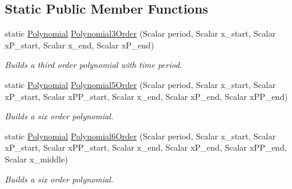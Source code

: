\subsection*{Static Public Member Functions}
\begin{DoxyCompactItemize}
\item 
static \hyperlink{classow__core_1_1Polynomial}{Polynomial} \hyperlink{classow__core_1_1Polynomial_a3a636b73b9a0370451c061065dba2aca}{Polynomial3\+Order} (Scalar period, Scalar x\+\_\+start, Scalar x\+P\+\_\+start, Scalar x\+\_\+end, Scalar x\+P\+\_\+end)
\begin{DoxyCompactList}\small\item\em Builds a third order polynomial with time period. \end{DoxyCompactList}\item 
static \hyperlink{classow__core_1_1Polynomial}{Polynomial} \hyperlink{classow__core_1_1Polynomial_a6dacc9b0c59cfb85de41f9adecdde592}{Polynomial5\+Order} (Scalar period, Scalar x\+\_\+start, Scalar x\+P\+\_\+start, Scalar x\+P\+P\+\_\+start, Scalar x\+\_\+end, Scalar x\+P\+\_\+end, Scalar x\+P\+P\+\_\+end)
\begin{DoxyCompactList}\small\item\em Builds a six order polynomial. \end{DoxyCompactList}\item 
static \hyperlink{classow__core_1_1Polynomial}{Polynomial} \hyperlink{classow__core_1_1Polynomial_ab40350dd45a8109068bf97ac266fdc72}{Polynomial6\+Order} (Scalar period, Scalar x\+\_\+start, Scalar x\+P\+\_\+start, Scalar x\+P\+P\+\_\+start, Scalar x\+\_\+end, Scalar x\+P\+\_\+end, Scalar x\+P\+P\+\_\+end, Scalar x\+\_\+middle)
\begin{DoxyCompactList}\small\item\em Builds a six order polynomial. \end{DoxyCompactList}\end{DoxyCompactItemize}
